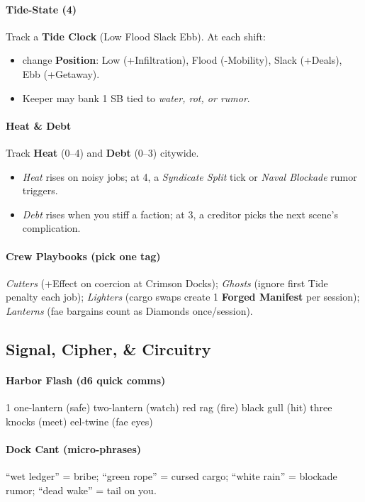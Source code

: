 \paragraph{Tide-State (4)}
Track a \textbf{Tide Clock} (Low \textrightarrow{} Flood \textrightarrow{} Slack \textrightarrow{} Ebb).  
At each shift: 
\begin{itemize}
\item change \textbf{Position}: Low (+Infiltration), Flood (-Mobility), Slack (+Deals), Ebb (+Getaway).
\item Keeper may bank 1 SB tied to \emph{water, rot, or rumor}.
\end{itemize}

\paragraph{Heat \& Debt}
Track \textbf{Heat} (0--4) and \textbf{Debt} (0--3) citywide.
\begin{itemize}
\item \emph{Heat} rises on noisy jobs; at 4, a \emph{Syndicate Split} tick or \emph{Naval Blockade} rumor triggers.
\item \emph{Debt} rises when you stiff a faction; at 3, a creditor picks the next scene's complication.
\end{itemize}

\paragraph{Crew Playbooks (pick one tag)}
\emph{Cutters} (+Effect on coercion at Crimson Docks); \emph{Ghosts} (ignore first Tide penalty each job); \emph{Lighters} (cargo swaps create 1 \textbf{Forged Manifest} per session); \emph{Lanterns} (fae bargains count as Diamonds once/session).

\subsection*{Signal, Cipher, \& Circuitry}

\paragraph{Harbor Flash (d6 quick comms)}
1 one-lantern (safe)  two-lantern (watch)  red rag (fire)  black gull (hit)  three knocks (meet)  eel-twine (fae eyes)

\paragraph{Dock Cant (micro-phrases)}
“wet ledger” = bribe; “green rope” = cursed cargo; “white rain” = blockade rumor; “dead wake” = tail on you.

